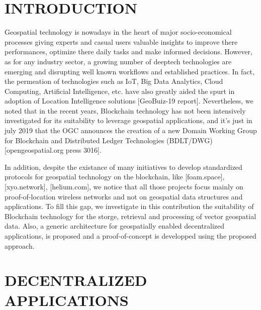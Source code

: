 \documentclass{isprs} %
\begin{document}

\maketitle


\section{INTRODUCTION}\label{INTRODUCTION}
 
\sloppy

Geospatial technology is nowadays in the heart of major socio-economical processes giving experts and casual users valuable insights to improve there performances, optimize there daily tasks and make informed decisions. However, as for any industry sector, a growing number of deeptech technologies are emerging and disrupting well known workflows and established practices. In fact, the permeation of technologies such as IoT, Big Data Analytics, Cloud Computing, Artificial Intelligence, etc. have also greatly aided the spurt in adoption of Location Intelligence solutions [GeoBuiz-19 report]. Nevertheless, we noted that in the recent years, Blockchain technology has not been intensively investigated for its suitability to leverage geospatial applications, and it's just in july 2019 that the OGC announces the creation of a new Domain Working Group for Blockchain and Distributed Ledger Technologies (BDLT/DWG)[opengeospatial.org press 3016].

In addition, despite the existance of many initiatives to develop standardized protocols for geospatial technology on the blockchain, like [foam.space], [xyo.network], [helium.com], we notice that all those projects focus mainly on proof-of-location wireless networks and not on geospatial data structures and applications. To fill this gap, we investigate in this contribution the suitability of Blockchain technology for the storge, retrieval and processing of vector geospatial data. Also, a generic architecture for geospatially enabled decentralized applications, is proposed and a proof-of-concept is developped using the proposed approach.

\newpage

\section{DECENTRALIZED APPLICATIONS}\label{sec:DECENTRALIZED APPLICATIONS}
 
\end{document}
